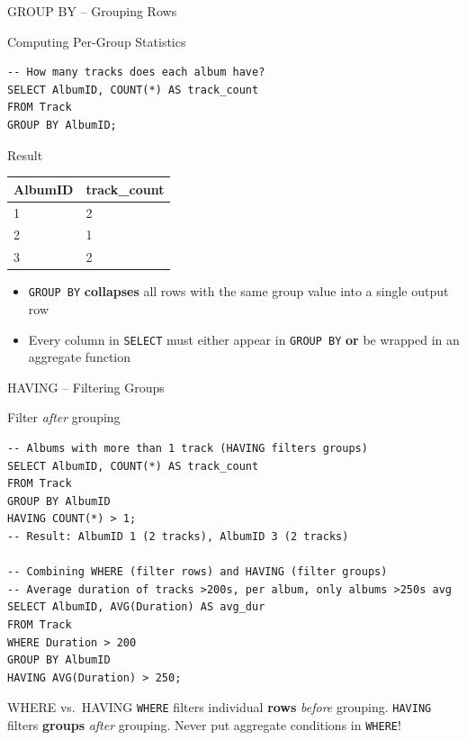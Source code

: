 \begin{frame}[fragile]{GROUP BY -- Grouping Rows}
  \begin{block}{Computing Per-Group Statistics}
\begin{lstlisting}[style=sqlstyle]
-- How many tracks does each album have?
SELECT AlbumID, COUNT(*) AS track_count
FROM Track
GROUP BY AlbumID;
\end{lstlisting}
  \end{block}

  \begin{block}{Result}
    \begin{tabular}{@{}ll@{}}
      \toprule
      \textbf{AlbumID} & \textbf{track\_count} \\
      \midrule
      1 & 2 \\
      2 & 1 \\
      3 & 2 \\
      \bottomrule
    \end{tabular}
  \end{block}

  \begin{itemize}
    \item \texttt{GROUP BY} \textbf{collapses} all rows with the same group value
          into a single output row
    \item Every column in \texttt{SELECT} must either appear in \texttt{GROUP BY}
          \textbf{or} be wrapped in an aggregate function
  \end{itemize}
\end{frame}

\begin{frame}[fragile]{HAVING -- Filtering Groups}
  \begin{block}{Filter \emph{after} grouping}
\begin{lstlisting}[style=sqlstyle]
-- Albums with more than 1 track (HAVING filters groups)
SELECT AlbumID, COUNT(*) AS track_count
FROM Track
GROUP BY AlbumID
HAVING COUNT(*) > 1;
-- Result: AlbumID 1 (2 tracks), AlbumID 3 (2 tracks)

-- Combining WHERE (filter rows) and HAVING (filter groups)
-- Average duration of tracks >200s, per album, only albums >250s avg
SELECT AlbumID, AVG(Duration) AS avg_dur
FROM Track
WHERE Duration > 200
GROUP BY AlbumID
HAVING AVG(Duration) > 250;
\end{lstlisting}
  \end{block}

  \begin{alertblock}{WHERE vs.\ HAVING}
    \texttt{WHERE} filters individual \textbf{rows} \emph{before} grouping.
    \texttt{HAVING} filters \textbf{groups} \emph{after} grouping.
    Never put aggregate conditions in \texttt{WHERE}!
  \end{alertblock}
\end{frame}

